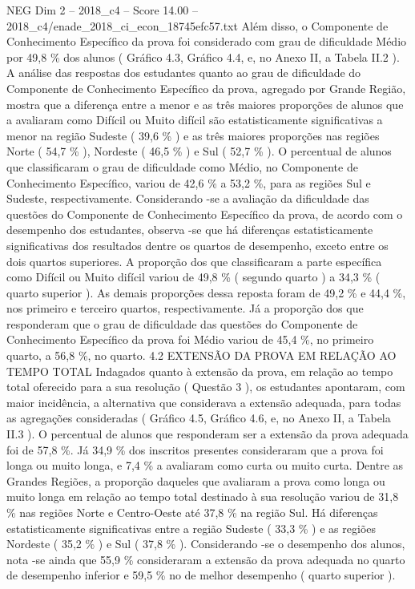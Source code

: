 \begin{textsample}{NEG Dim 2 – 2018\_c4 – Score 14.00 – 2018\_c4/enade\_2018\_ci\_econ\_18745efc57.txt}
Além disso, o Componente de Conhecimento Específico da prova foi considerado com grau de dificuldade Médio por 49,8 \% dos alunos ( Gráfico 4.3, Gráfico 4.4, e, no Anexo II, a Tabela II.2 ).
A análise das respostas dos estudantes quanto ao grau de dificuldade do Componente de Conhecimento Específico da prova, agregado por Grande Região, mostra que a diferença entre a menor e as três maiores proporções de alunos que a avaliaram como Difícil ou Muito difícil são estatisticamente significativas a menor na região Sudeste ( 39,6 \% ) e as três maiores proporções nas regiões Norte ( 54,7 \% ), Nordeste ( 46,5 \% ) e Sul ( 52,7 \% ).
O percentual de alunos que classificaram o grau de dificuldade como Médio, no Componente de Conhecimento Específico, variou de 42,6 \% a 53,2 \%, para as regiões Sul e Sudeste, respectivamente.
Considerando -se a avaliação da dificuldade das questões do Componente de Conhecimento Específico da prova, de acordo com o desempenho dos estudantes, observa -se que há diferenças estatisticamente significativas dos resultados dentre os quartos de desempenho, exceto entre os dois quartos superiores.
A proporção dos que classificaram a parte específica como Difícil ou Muito difícil variou de 49,8 \% ( segundo quarto ) a 34,3 \% ( quarto superior ).
As demais proporções dessa reposta foram de 49,2 \% e 44,4 \%, nos primeiro e terceiro quartos, respectivamente.
Já a proporção dos que responderam que o grau de dificuldade das questões do Componente de Conhecimento Específico da prova foi Médio variou de 45,4 \%, no primeiro quarto, a 56,8 \%, no quarto. 4.2 EXTENSÃO DA PROVA EM RELAÇÃO AO TEMPO TOTAL Indagados quanto à extensão da prova, em relação ao tempo total oferecido para a sua resolução ( Questão 3 ), os estudantes apontaram, com maior incidência, a alternativa que considerava a extensão adequada, para todas as agregações consideradas ( Gráfico 4.5, Gráfico 4.6, e, no Anexo II, a Tabela II.3 ).
O percentual de alunos que responderam ser a extensão da prova adequada foi de 57,8 \%.
Já 34,9 \% dos inscritos presentes consideraram que a prova foi longa ou muito longa, e 7,4 \% a avaliaram como curta ou muito curta.
Dentre as Grandes Regiões, a proporção daqueles que avaliaram a prova como longa ou muito longa em relação ao tempo total destinado à sua resolução variou de 31,8 \% nas regiões Norte e Centro-Oeste até 37,8 \% na região Sul.
Há diferenças estatisticamente significativas entre a região Sudeste ( 33,3 \% ) e as regiões Nordeste ( 35,2 \% ) e Sul ( 37,8 \% ).
Considerando -se o desempenho dos alunos, nota -se ainda que 55,9 \% consideraram a extensão da prova adequada no quarto de desempenho inferior e 59,5 \% no de melhor desempenho ( quarto superior ).

\end{textsample}

